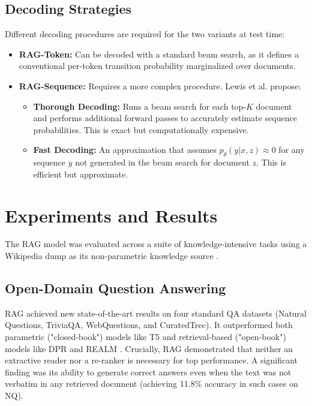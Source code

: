 \documentclass[a4paper,12pt]{article}
\begin{document}
\subsection{Decoding Strategies}
Different decoding procedures are required for the two variants at test time:
\begin{itemize}
    \item \textbf{RAG-Token:} Can be decoded with a standard beam search, as it defines a conventional per-token transition probability marginalized over documents.
    \item \textbf{RAG-Sequence:} Requires a more complex procedure. Lewis et al. propose:
    \begin{itemize}
        \item \textbf{Thorough Decoding:} Runs a beam search for each top-$K$ document and performs additional forward passes to accurately estimate sequence probabilities. This is exact but computationally expensive.
        \item \textbf{Fast Decoding:} An approximation that assumes $p_{\theta}(y|x, z) \approx 0$ for any sequence $y$ not generated in the beam search for document $z$. This is efficient but approximate.
    \end{itemize}
\end{itemize}

\section{Experiments and Results}

The RAG model was evaluated across a suite of knowledge-intensive tasks using a Wikipedia dump as its non-parametric knowledge source \cite{lewis2020rag}.

\subsection{Open-Domain Question Answering}
RAG achieved new state-of-the-art results on four standard QA datasets (Natural Questions, TriviaQA, WebQuestions, and CuratedTrec). It outperformed both parametric ("closed-book") models like T5 \cite{raffel2020t5} and retrieval-based ("open-book") models like DPR \cite{karpukhin2020dpr} and REALM \cite{guu2020realm}. Crucially, RAG demonstrated that neither an extractive reader nor a re-ranker is necessary for top performance. A significant finding was its ability to generate correct answers even when the text was not verbatim in any retrieved document (achieving 11.8\% accuracy in such cases on NQ).
\end{document}
